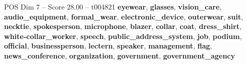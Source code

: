\begin{textsample}{POS Dim 7 – Score 28.00 – t004821}  \label{ex:f7_pos_009}
\textbf{eyewear}, \textbf{glasses}, \textbf{vision\_care}, \textbf{audio\_equipment}, \textbf{formal\_wear}, \textbf{electronic\_device}, \textbf{outerwear}, \textbf{suit}, \textbf{necktie}, \textbf{spokesperson}, \textbf{microphone}, \textbf{blazer}, \textbf{collar}, \textbf{coat}, \textbf{dress\_shirt}, \textbf{white-collar\_worker}, \textbf{speech}, \textbf{public\_address\_system}, \textbf{job}, \textbf{podium}, \textbf{official}, \textbf{businessperson}, \textbf{lectern}, \textbf{speaker}, \textbf{management}, \textbf{flag}, \textbf{news\_conference}, \textbf{organization}, \textbf{government}, \textbf{government\_agency}

\end{textsample}
